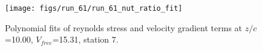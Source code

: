 \begin{figure}[H]
\centering
\texttt{[image: figs/run\_61/run\_61\_nut\_ratio\_fit]}
\caption{Polynomial fits of reynolds stress and velocity gradient terms at $z/c$=10.00, $V_{free}$=15.31, station 7.}
\label{fig:run_61_nut_ratio_fit}
\end{figure}


